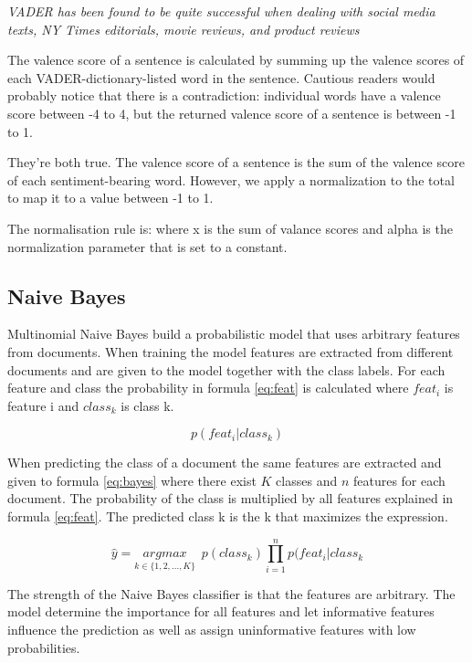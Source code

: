 \documentclass[a4paper, 12pt]{article}
\begin{document}
\textit{VADER has been found to be quite successful when dealing with social media texts, NY Times editorials, movie reviews, and product reviews} \cite{pandey_vader_tutorial}

The valence score of a sentence is calculated by summing up the valence scores of each VADER-dictionary-listed word in the sentence. Cautious readers would probably notice that there is a contradiction: individual words have a valence score between -4 to 4, but the returned valence score of a sentence is between -1 to 1.

They’re both true. The valence score of a sentence is the sum of the valence score of each sentiment-bearing word. However, we apply a normalization to the total to map it to a value between -1 to 1. \cite{hutto_vader}

The normalisation rule is:
where x is the sum of valance scores and alpha is the normalization parameter that is set to a constant.
\large {}

\subsection{Naive Bayes}

Multinomial Naive Bayes build a probabilistic model that uses arbitrary features from documents. When training the model features are extracted from different documents and are given to the model together with the class labels.
For each feature and class the probability in formula \ref{eq:feat} is calculated where $ feat_{i}$ is feature i and $ class_k $ is class k.

\large
\begin{equation}
    p (feat_{i}|class_{k})
    \label{eq:feat}
\end{equation}
\normalsize

When predicting the class of a document the same features are extracted and given to formula \ref{eq:bayes} where there exist $K$ classes and $n$ features for each document.
The probability of the class is multiplied by all features explained in formula \ref{eq:feat}.
The predicted class k is the k that maximizes the expression.

\large
\begin{equation}
    \hat{y} = \underset{k \in \{1,2,...,K\}}{argmax} \, \, \, p(class_{k}) \prod_{i=1}^{n} p (feat_{i}|class_{k}
    \label{eq:bayes}
\end{equation}
\normalsize

The strength of the Naive Bayes classifier is that the features are arbitrary.
The model determine the importance for all features and let informative features influence the prediction as well as assign uninformative features with low probabilities. \cite{TextMininglecture} \cite{rish2001empirical}
\end{document}
